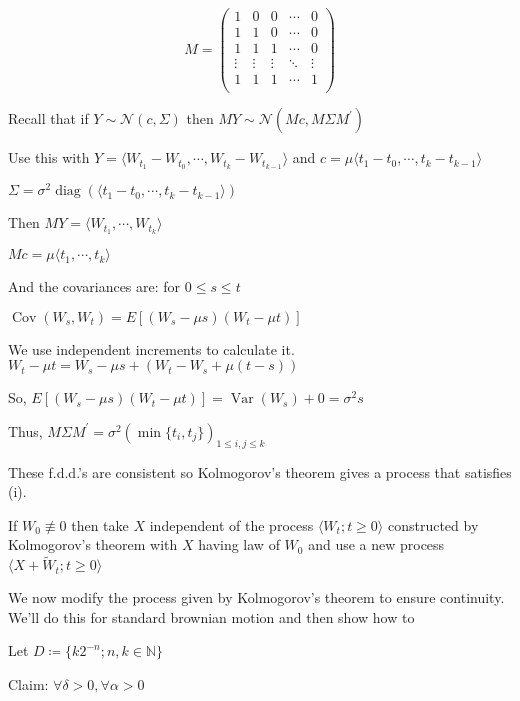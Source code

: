 \documentclass{article}
\theoremstyle{definition}
\begin{document}
\[
    M = \begin{pmatrix}
        1 & 0 & 0 & \cdots &  0 \\
        1 & 1 & 0 & \cdots &  0 \\
        1 & 1 & 1 & \cdots &  0 \\
        \vdots & \vdots & \vdots & \ddots &  \vdots \\
        1 & 1 & 1 & \cdots &  1 \\
    \end{pmatrix}
\]

Recall that if \(Y \sim \mathcal{N}(c,\Sigma)\) then \(MY \sim \mathcal{N}(Mc, M \Sigma M^{\prime})\)  

Use this with \(Y = \langle W_{t_1} - W_{t_0},\cdots, W_{t_k} - W_{t_{k-1}} \rangle \) and \(c = \mu \langle t_1 - t_0, \cdots, t_k - t_{k-1} \rangle \) 

\(\Sigma = \sigma^2 \operatorname{diag} (\langle t_1 - t_0, \cdots, t_k - t_{k-1} \rangle ) \) 

Then \(MY = \langle W_{t_1},\cdots,W_{t_k} \rangle \) 

\(Mc = \mu\langle t_1,\cdots,t_k \rangle \) 

And the covariances are: for \(0 \leq s \leq t\) 

\(\operatorname{Cov}(W_s, W_t) = E[(W_s - \mu s)(W_t - \mu t)]\) 

We use independent increments to calculate it. \(W_t - \mu t = W_s - \mu s + (W_t - W_s + \mu(t-s))\) 

So, \(E[(W_s - \mu s)(W_t - \mu t)] = \operatorname{Var}(W_s) + 0 = \sigma^2 s\)

Thus, \(M \Sigma M^{\prime} = \sigma^2 (\min\{ t_i, t_j \} )_{1 \leq i, j \leq k}\)

These f.d.d.'s are consistent so Kolmogorov's theorem gives a process that satisfies (i).

If \(W_0 \not \equiv 0\) then take \(X\) independent of the process \(\langle W_t ; t \geq 0 \rangle \)  constructed by Kolmogorov's theorem with \(X\) having law of \(W_0\) and use a new process \(\langle X + \tilde{W}_t ; t \geq 0 \rangle \) 

We now modify the process given by Kolmogorov's theorem to ensure continuity. We'll do this for standard brownian motion and then show how to

Let \(D \coloneqq \{ k 2 ^{-n} ; n,k\in\mathbb{N}  \} \) 

Claim: \(\forall \delta > 0, \forall \alpha  > 0\) 
\end{document}
